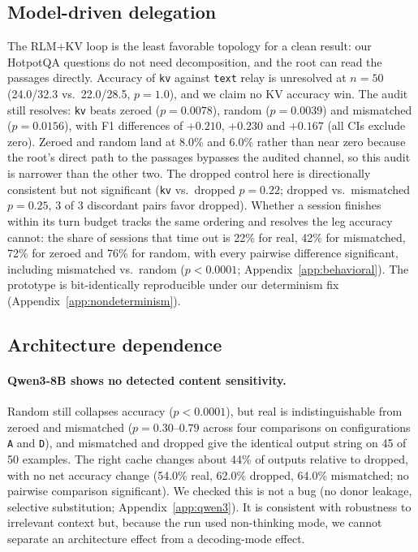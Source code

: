 \documentclass[11pt]{article}
\begin{document}
\subsection{Model-driven delegation}

The RLM+KV loop is the least favorable topology for a clean result: our
HotpotQA questions do not need decomposition, and the root can read the
passages directly. Accuracy of \texttt{kv} against \texttt{text} relay is
unresolved at $n{=}50$ (24.0/32.3 vs.\ 22.0/28.5, $p=1.0$), and we claim
no KV accuracy win. The audit still resolves: \texttt{kv} beats zeroed
($p=0.0078$), random ($p=0.0039$) and mismatched ($p=0.0156$), with F1
differences of $+0.210$, $+0.230$ and $+0.167$ (all CIs exclude zero).
Zeroed and random land at 8.0\% and 6.0\% rather than near zero because
the root's direct path to the passages bypasses the audited channel, so
this audit is narrower than the other two. The dropped control here is
directionally consistent but not significant (\texttt{kv} vs.\ dropped
$p=0.22$; dropped vs.\ mismatched $p=0.25$, 3 of 3 discordant pairs favor
dropped). Whether a session finishes within its turn budget tracks the
same ordering and resolves the leg accuracy cannot: the share of sessions
that time out is 22\% for real, 42\% for mismatched, 72\% for zeroed and 76\%
for random, with every pairwise difference significant, including mismatched
vs.\ random ($p<0.0001$; Appendix~\ref{app:behavioral}). The prototype is
bit-identically reproducible under our determinism fix
(Appendix~\ref{app:nondeterminism}).

\subsection{Architecture dependence}

\paragraph{Qwen3-8B shows no detected content sensitivity.} Random still
collapses accuracy ($p<0.0001$), but real is indistinguishable from
zeroed and mismatched ($p=0.30$--$0.79$ across four comparisons on configurations \texttt{A} and \texttt{D}), and
mismatched and dropped give the identical output string on 45 of 50
examples. The right cache changes about 44\% of outputs relative to
dropped, with no net accuracy change (54.0\% real, 62.0\% dropped, 64.0\%
mismatched; no pairwise comparison significant). We checked this is not a
bug (no donor leakage, selective substitution; Appendix~\ref{app:qwen3}).
It is consistent with robustness to irrelevant context but, because the
run used non-thinking mode, we cannot separate an architecture effect from
a decoding-mode effect.
\end{document}
